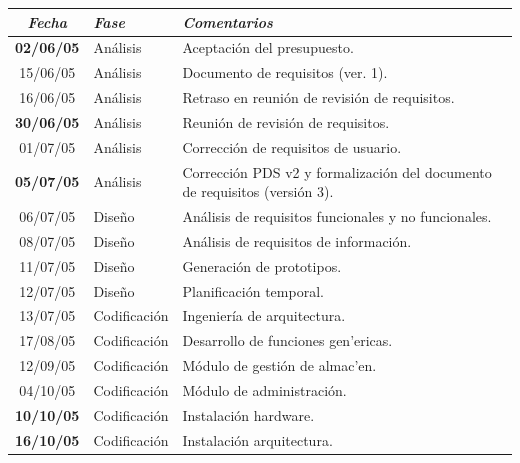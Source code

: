 \documentclass[a4paper]{article}
\begin{document}
        \begin{center}
            \begin{longtable}{|| c | l | p{} ||}
                \hline
                \hline
                \emph{\textbf{Fecha}} & \emph{\textbf{Fase}} & \emph{\textbf{Comentarios}}\\
                \hline
                \hline
                \textbf{02/06/05} & Análisis & Aceptación del presupuesto. \\
                \hline
                15/06/05 & Análisis & Documento de requisitos (ver. 1). \\
                \hline
                16/06/05 & Análisis & Retraso en reunión de revisión de requisitos. \\
                \hline
                \textbf{30/06/05} & Análisis & Reunión de revisión de requisitos. \\
                \hline 
                01/07/05 & Análisis & Corrección de requisitos de usuario. \\
                \hline 
                \textbf{05/07/05} & Análisis & Corrección PDS v2 y formalización del documento de requisitos (versión 3). \\
                \hline
                \hline
                06/07/05 & Diseño & Análisis de requisitos funcionales y no funcionales. \\
                \hline
                08/07/05 & Diseño & Análisis de requisitos de información. \\
                \hline 
                11/07/05 & Diseño & Generación de prototipos. \\
                \hline
                12/07/05 & Diseño & Planificación temporal. \\
                \hline
                \hline
                13/07/05 & Codificación & Ingeniería de arquitectura. \\
                \hline
                17/08/05 & Codificación & Desarrollo de funciones gen'ericas. \\
                \hline
                12/09/05 & Codificación & Módulo de gestión de almac'en. \\
                \hline
                04/10/05 & Codificación & Módulo de administración. \\
                \hline
                \textbf{10/10/05} & Codificación & Instalación hardware. \\
                \hline
                \textbf{16/10/05} & Codificación & Instalación arquitectura. \\

\end{longtable}
\end{center}
\end{document}
